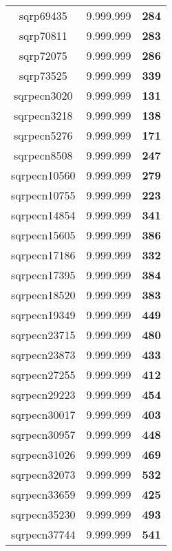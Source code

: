 \begin{tabular}{cc||c}
sqrp69435        & 9.999.999        & {\bf 284}       \\ 
sqrp70811        & 9.999.999        & {\bf 283}       \\ 
sqrp72075        & 9.999.999        & {\bf 286}       \\ 
sqrp73525        & 9.999.999        & {\bf 339}       \\ 
sqrpecn3020      & 9.999.999        & {\bf 131}       \\ 
sqrpecn3218      & 9.999.999        & {\bf 138}       \\ 
sqrpecn5276      & 9.999.999        & {\bf 171}       \\ 
sqrpecn8508      & 9.999.999        & {\bf 247}       \\ 
sqrpecn10560     & 9.999.999        & {\bf 279}       \\ 
sqrpecn10755     & 9.999.999        & {\bf 223}       \\ 
sqrpecn14854     & 9.999.999        & {\bf 341}       \\ 
sqrpecn15605     & 9.999.999        & {\bf 386}       \\ 
sqrpecn17186     & 9.999.999        & {\bf 332}       \\ 
sqrpecn17395     & 9.999.999        & {\bf 384}       \\ 
sqrpecn18520     & 9.999.999        & {\bf 383}       \\ 
sqrpecn19349     & 9.999.999        & {\bf 449}       \\ 
sqrpecn23715     & 9.999.999        & {\bf 480}       \\ 
sqrpecn23873     & 9.999.999        & {\bf 433}       \\ 
sqrpecn27255     & 9.999.999        & {\bf 412}       \\ 
sqrpecn29223     & 9.999.999        & {\bf 454}       \\ 
sqrpecn30017     & 9.999.999        & {\bf 403}       \\ 
sqrpecn30957     & 9.999.999        & {\bf 448}       \\ 
sqrpecn31026     & 9.999.999        & {\bf 469}       \\ 
sqrpecn32073     & 9.999.999        & {\bf 532}       \\ 
sqrpecn33659     & 9.999.999        & {\bf 425}       \\ 
sqrpecn35230     & 9.999.999        & {\bf 493}       \\ 
sqrpecn37744     & 9.999.999        & {\bf 541}       \\ 

\end{tabular}
